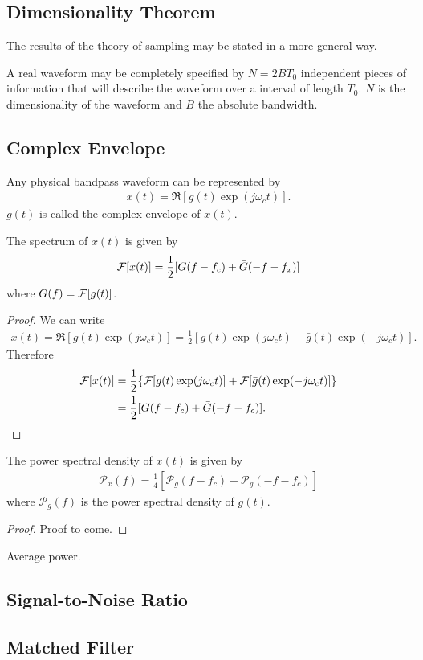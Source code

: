 \documentclass{memoir}
\begin{document}
\subsection{Dimensionality Theorem}
The results of the theory of sampling may be stated in a more general way.
\begin{theorem}[Dimensionality]
   A real waveform may be completely specified by $N=2 B T_0$ independent pieces of information that will describe the waveform over a interval of length $T_0$. $N$ is the dimensionality of the waveform and $B$ the absolute bandwidth.
\end{theorem}

\subsection{Complex Envelope}
\begin{theorem}
    Any physical bandpass waveform can be represented by
    \begin{align*}
        x(t) = \Re[g(t) \exp(j \omega_c t)].
    \end{align*}
    $g(t)$ is called the complex envelope of $x(t)$.
\end{theorem}
\begin{theorem}
    The spectrum of $x(t)$ is given by
    \begin{align*}
        \mathcal{F}[x(t)] = \frac{1}{2}[G(f-f_c)+\bar{G}(-f-f_x)]
    \end{align*}
    where $G(f) = \mathcal{F}[g(t)]$.
\end{theorem}
\begin{proof}
    We can write
    \begin{align*}
        x(t) = \Re[g(t) \exp(j \omega_c t)]
        = \frac{1}{2}[g(t) \exp(j \omega_c t) + \bar{g}(t) \exp(-j \omega_c t)].
    \end{align*}
    Therefore
    \begin{align*}
        \mathcal{F}[x(t)] &= \frac{1}{2}\{\mathcal{F}[g(t) \exp(j \omega_c t)] + \mathcal{F}[\bar{g}(t) \exp(-j \omega_c t)]\} \\
        &= \frac{1}{2}[G(f-f_c)+\bar{G}(-f-f_c)].
    \end{align*}
\end{proof}

\begin{theorem}
    The power spectral density of $x(t)$ is given by
    \begin{align*}
        \mathcal{P}_x(f) = \frac{1}{4}[\mathcal{P}_g(f-f_c) + \bar{\mathcal{P}}_g(-f-f_c)]
    \end{align*}
    where $\mathcal{P}_g(f)$ is the power spectral density of $g(t)$.
\end{theorem}
\begin{proof}
    Proof to come.
\end{proof}

\begin{theorem}
    Average power.
\end{theorem}

\subsection{Signal-to-Noise Ratio}

\subsection{Matched Filter}
\end{document}

